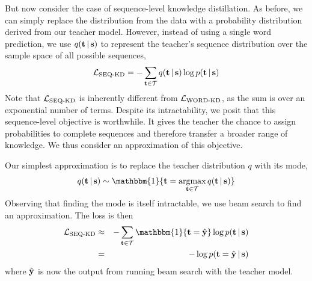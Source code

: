 \documentclass[11pt,letterpaper]{article}
\DeclareMathOperator*{\argmax}{argmax}
\begin{document}
But now consider the case of sequence-level knowledge distillation.  
As before, we
can simply replace the distribution from the data with a probability
distribution derived from our teacher model.
However, instead of using
a single word prediction, we use $q(\mathbf{t} \,|\, \mathbf{s})$ to represent
the teacher's sequence distribution over the sample space of
all possible sequences,
\begin{equation*}
\mathcal{L}_{\text{SEQ-KD}} = -\sum_{\mathbf{t} \in \mathcal{T}} q(\mathbf{t} \,|\, \mathbf{s}) \log p (\mathbf{t} \,|\, \mathbf{s})
\end{equation*}
Note that $\mathcal{L}_\text{SEQ-KD}$ is inherently different from $\mathcal{L}_\text{WORD-KD}$, as the sum is over an
exponential  number of terms. Despite its intractability, we posit that this sequence-level
objective is worthwhile. It gives the teacher the chance to
assign probabilities to complete sequences and therefore transfer a
broader range of knowledge. We thus consider an approximation of this
objective.

Our simplest approximation is to replace the teacher
distribution $q$ with its mode,
\begin{equation*}
q(\tvec \given \svec) \sim \mathbbm{1}\{\tvec = \argmax_{\tvec \in \mcT} q(\tvec \given \svec )\}
\end{equation*}
Observing that finding the mode is itself intractable, we use beam search 
to find an approximation. The loss is then
\begin{eqnarray*}
\mcL_{\text{SEQ-KD}} &\approx&  - \sum_{\tvec \in \mcT} \mathbbm{1}\{\tvec = \hat{\yvec} \} \log p (\tvec \given \svec) \\
&=& - \log p (\tvec = \hat{\yvec} \given \svec)
\end{eqnarray*}
where $\hat{\mathbf{y}}$ is now the output from running beam search with the teacher model.
\end{document}
